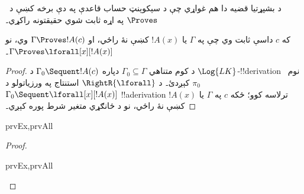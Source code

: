 \documentclass[../../../include/open-logic-section]{subfiles}
\begin{document}

\begin{explain}
  د بشپړتيا قضيه دا هم غواړي چې د سېکوېنټ حساب قاعدې په دې برخه
  کښې د~$\Proves$ په اړه ثابت شوي حقيقتونه راکړي۔
\end{explain}

\begin{thm}
 که $c$ داسې ثابت وي چې په
$\Gamma$ يا $!A(x)$ کښې نۀ راځي، او $\Gamma \Proves !A(c)$ وي، نو
$\Gamma \Proves \lforall[x][!A(x)]$۔
\end{thm}

\begin{proof}
د کوم متناهي $\Gamma_0 \subseteq \Gamma$ دپاره
$\Gamma_0 \Sequent !A(c)$ د $\Log{LK}$-!!{derivation} نوم~$\pi_0$
کېږدئ۔ د $\RightR{\lforall}$ استنتاج په ورزياتولو د
$\Gamma_0 \Sequent \lforall[x][!A(x)]$ !!a{derivation} ترلاسه کوو؛
ځکه $c$ په $\Gamma$ يا $!A(x)$ کښې نۀ راځي، نو د ځانګړي متغير شرط
پوره کېږي۔
\end{proof}

\begin{prop}
\begin{tagenumerate}{prvEx,prvAll}
\end{tagenumerate}
\end{prop}

\begin{proof}
\begin{tagenumerate}{prvEx,prvAll}
\end{tagenumerate}
\end{proof}
\end{document}
